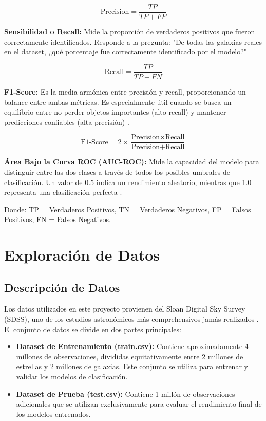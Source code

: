 \documentclass{article}
\begin{document}
\begin{equation}
\text{Precision} = \frac{TP}{TP + FP}
\end{equation}

\textbf{Sensibilidad o Recall:} Mide la proporción de verdaderos positivos que fueron correctamente identificados. Responde a la pregunta: "De todas las galaxias reales en el dataset, ¿qué porcentaje fue correctamente identificado por el modelo?" \cite{recall_metric}

\begin{equation}
\text{Recall} = \frac{TP}{TP + FN}
\end{equation}

\textbf{F1-Score:} Es la media armónica entre precisión y recall, proporcionando un balance entre ambas métricas. Es especialmente útil cuando se busca un equilibrio entre no perder objetos importantes (alto recall) y mantener predicciones confiables (alta precisión) \cite{fscore_metric}.

\begin{equation}
\text{F1-Score} = 2 \times \frac{\text{Precision} \times \text{Recall}}{\text{Precision} + \text{Recall}}
\end{equation}

\textbf{Área Bajo la Curva ROC (AUC-ROC):} Mide la capacidad del modelo para distinguir entre las dos clases a través de todos los posibles umbrales de clasificación. Un valor de 0.5 indica un rendimiento aleatorio, mientras que 1.0 representa una clasificación perfecta \cite{roc_metric}.

Donde: TP = Verdaderos Positivos, TN = Verdaderos Negativos, FP = Falsos Positivos, FN = Falsos Negativos.

\section{Exploración de Datos}

\subsection{Descripción de Datos}

Los datos utilizados en este proyecto provienen del Sloan Digital Sky Survey (SDSS), uno de los estudios astronómicos más comprehensivos jamás realizados \cite{kaggle_dataset}. El conjunto de datos se divide en dos partes principales:

\begin{itemize}
    \item \textbf{Dataset de Entrenamiento (train.csv):} Contiene aproximadamente 4 millones de observaciones, divididas equitativamente entre 2 millones de estrellas y 2 millones de galaxias. Este conjunto se utiliza para entrenar y validar los modelos de clasificación.
    \item \textbf{Dataset de Prueba (test.csv):} Contiene 1 millón de observaciones adicionales que se utilizan exclusivamente para evaluar el rendimiento final de los modelos entrenados.
\end{itemize}
\end{document}
